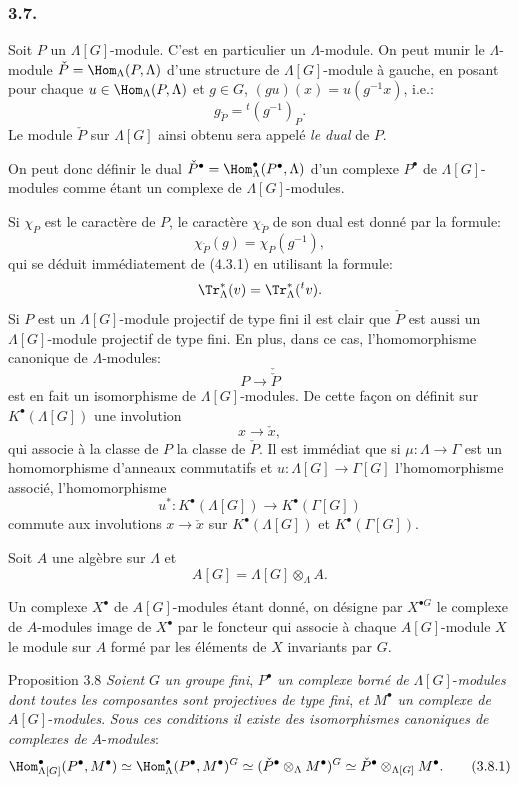 \subsubsection*{3.7.}

Soit $P$ un $\Lambda[G]$-module. C'est en particulier un $\Lambda$-module. On peut munir le $\Lambda$-module $\check P=\Hom_\Lambda(P,\Lambda)$ d'une structure de $\Lambda[G]$-module à gauche, en posant pour chaque $u\in\Hom_\Lambda(P,\Lambda)$ et $g\in G$, $(gu)(x)=u(g^{-1}x)$, i.e.:
\[
g_{\check P}={}^{t}(g^{-1})_P.
\tag{3.7.1}
\]
Le module $\check P$ sur $\Lambda[G]$ ainsi obtenu sera appelé \emph{le dual} de $P$.

On peut donc définir le dual $\check P^\bullet=\Hom_\Lambda^\bullet(P^\bullet,\Lambda)$ d'un complexe $P^\bullet$ de $\Lambda[G]$-modules comme étant un complexe de $\Lambda[G]$-modules.

Si $\chi_P$ est le caractère de $P$, le caractère $\chi_{\check P}$ de son dual est donné par la formule:
\[
\chi_{\check P}(g)=\chi_P(g^{-1}),
\tag{3.7.2}
\]
qui se déduit immédiatement de (4.3.1) en utilisant la formule:
\[
\Tr_\Lambda^*(v)=\Tr_\Lambda^*({}^{t}v).
\]
Si $P$ est un $\Lambda[G]$-module projectif de type fini il est clair que $\check P$ est aussi un $\Lambda[G]$-module projectif de type fini. En plus, dans ce cas, l'homomorphisme canonique de $\Lambda$-modules:
\[
P\longrightarrow\check{\check P}
\]
est en fait un isomorphisme de $\Lambda[G]$-modules. De cette façon on définit sur $K^{\bullet}(\Lambda[G])$ une involution
\[
x\longrightarrow \check x,
\]
qui associe à la classe de $P$ la classe de $\check P$. Il est immédiat que si $\mu:\Lambda\to\Gamma$ est un homomorphisme d'anneaux commutatifs et $u:\Lambda[G]\to\Gamma[G]$ l'homomorphisme associé, l'homomorphisme
\[
u^*:K^{\bullet}(\Lambda[G])\longrightarrow K^{\bullet}(\Gamma[G])
\]
commute aux involutions $x\longrightarrow \check x$ sur 
$K^{\bullet}(\Lambda[G])$ et $K^{\bullet}(\Gamma[G])$.

Soit $A$ une algèbre sur $\Lambda$ et
\[
A[G]=\Lambda[G]\otimes_\Lambda A.
\]

Un complexe $X^\bullet$ de $A[G]$-modules étant donné, on désigne par $X^{\bullet G}$ le complexe de $A$-modules image de $X^\bullet$ par le foncteur qui associe à chaque $A[G]$-module $X$ le module sur $A$ formé par les éléments de $X$ invariants par $G$.

\begin{statement}{Proposition 3.8}
\emph{Soient} $G$ \emph{un groupe fini}, $P^\bullet$ \emph{un complexe borné de} $\Lambda[G]$-\emph{modules dont toutes les composantes sont projectives de type fini}, \emph{et} $M^\bullet$ \emph{un complexe de} $A[G]$-\emph{modules}. \emph{Sous ces conditions il existe des isomorphismes canoniques de complexes de} $A$-\emph{modules}:
\[
\Hom_{\Lambda[G]}^\bullet(P^\bullet,M^\bullet)
\simeq \Hom_\Lambda^\bullet(P^\bullet,M^\bullet)^G
\simeq (\check P^\bullet\otimes_\Lambda M^\bullet)^G
\simeq \check P^\bullet\otimes_{\Lambda[G]}M^\bullet.
\tag{3.8.1}
\]
\end{statement}

